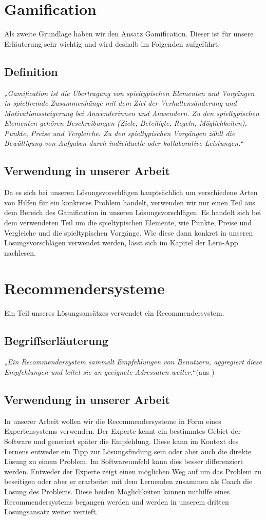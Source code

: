 \section{Gamification}
Als zweite Grundlage haben wir den Ansatz Gamification. Dieser ist für unsere Erläuterung sehr wichtig und wird deshalb im Folgenden aufgeführt.
\subsection{Definition}
„\textit{Gamification ist die Übertragung von spieltypischen Elementen und Vorgängen in spielfremde Zusammenhänge mit dem Ziel der Verhaltensänderung und Motivationssteigerung bei Anwenderinnen und Anwendern. Zu den spieltypischen Elementen gehören Beschreibungen (Ziele, Beteiligte, Regeln, Möglichkeiten), Punkte, Preise und Vergleiche. Zu den spieltypischen Vorgängen zählt die Bewältigung von Aufgaben durch individuelle oder kollaborative Leistungen.}“ \cite{gamification}

\subsection{Verwendung in unserer Arbeit}
Da es sich bei unseren Lösungsvorschlägen hauptsächlich um verschiedene Arten von Hilfen für ein konkretes Problem handelt, verwenden wir nur einen Teil aus dem Bereich des Gamification in unseren Lösungsvorschlägen. Es handelt sich bei dem verwendeten Teil um die spieltypischen Elemente, wie Punkte, Preise und Vergleiche und die spieltypischen Vorgänge. Wie diese dann konkret in unseren Lösungsvorschlägen verwendet werden, lässt sich im Kapitel der Lern-App nachlesen.

\section{Recommendersysteme}
Ein Teil unseres Lösungsansätzes verwendet ein Recommendersystem.
\subsection{Begriffserläuterung}
„\textit{Ein Recommendersystem sammelt Empfehlungen von Benutzern, aggregiert diese Empfehlungen und leitet sie an geeignete Adressaten weiter.}“(aus \cite{recommender})

\subsection{Verwendung in unserer Arbeit}
In unserer Arbeit wollen wir die Recommendersysteme in Form eines Expertensystems verwenden.  Der Experte kennt ein bestimmtes Gebiet der Software und generiert später die Empfehlung. Diese kann im Kontext des Lernens entweder ein Tipp zur Lösungsfindung sein oder aber auch die direkte Lösung zu einem Problem. Im Softwareumfeld kann dies besser differenziert werden. Entweder der Experte zeigt einen möglichen  Weg auf um das Problem zu beseitigen oder aber er erarbeitet mit dem Lernenden zusammen als Coach die Lösung des Problems. Diese beiden Möglichkeiten können mithilfe eines Recommendersystems begangen werden und werden in unserem dritten Lösungsansatz weiter vertieft.


